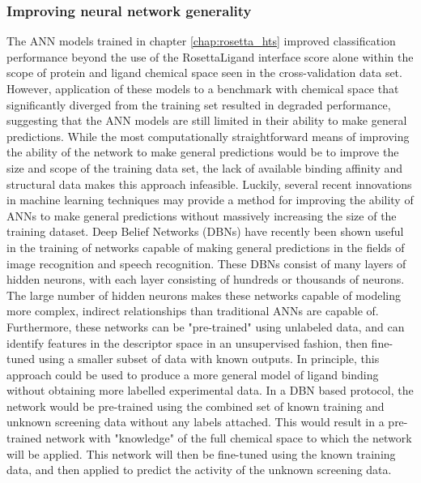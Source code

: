 \subsubsection{Improving neural network generality}
The ANN models trained in chapter \ref{chap:rosetta_hts} improved classification performance beyond the use of the RosettaLigand interface score alone within the scope of protein and ligand chemical space seen in the cross-validation data set.
However, application of these models to a benchmark with chemical space that significantly diverged from the training set resulted in degraded performance, suggesting that the ANN models are still limited in their ability to make general predictions.
While the most computationally straightforward means of improving the ability of the network to make general predictions would be to improve the size and scope of the training data set, the lack of available binding affinity and structural data makes this approach infeasible. 
Luckily, several recent innovations in machine learning techniques may provide a method for improving the ability of ANNs to make general predictions without massively increasing the size of the training dataset.
Deep Belief Networks (DBNs)\citep{Hinton:2006dy} have recently been shown useful in the training of networks capable of making general predictions in the fields of image recognition\citep{Le:2013kz,Bengio:2009kb} and speech recognition\citep{Heigold:2013us}.
These DBNs consist of many layers of hidden neurons, with each layer consisting of hundreds or thousands of neurons.
The large number of hidden neurons makes these networks capable of modeling more complex, indirect relationships than traditional ANNs are capable of.
Furthermore, these networks can be "pre-trained" using unlabeled data, and can identify features in the descriptor space in an unsupervised fashion, then fine-tuned using a smaller subset of data with known outputs.
In principle, this approach could be used to produce a more general model of ligand binding without obtaining more labelled experimental data.
In a DBN based protocol, the network would be pre-trained using the combined set of known training and unknown screening data without any labels attached.
This would result in a pre-trained network with "knowledge" of the full chemical space to which the network will be applied.
This network will then be fine-tuned using the known training data, and then applied to predict the activity of the unknown screening data.

